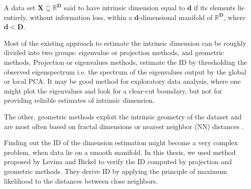 \begin{definition}
A data set $\mathbf{X}\subseteq \mathbb{R}^{\mathbf{D}}$ said to have intrinsic dimension equal to $\mathbf{d}$  if its elements lie entirely, without information loss, within a $\mathbf{d}$-dimensional manifold of $\mathbb{R}^{\mathbf{D}}$, where $\mathbf{d} < \mathbf{D}$.
\end{definition}

Most of the existing approach to estimate the intrinsic dimension can be roughly divided into two groups: eigenvalue or projection methods, and geometric methods. Projection or eigenvalues methods, estimate the ID by thresholding the observed eigenspectrum i.e. the spectrum of the eigenvalues output by the global or local PCA. It may be good method for exploratory
data analysis, where one might plot the eigenvalues and look for a clear-cut boundary, but not for providing reliable estimates of intrinsic dimension.

The other, geometric methods exploit the intrinsic geometry of the dataset and are most often based on fractal dimensions or nearest neighbor (NN) distances \citep{Lev2005}.

Finding out the ID of the dimension estimation might become a very complex problem, when data lie on a smooth manifold. In this thesis, we used method proposed by Levina and Bickel \citep{Lev2005} to verify the ID computed by projection and geometric methods. They derive ID by applying the principle of maximum likelihood to the distances between close neighbors. 
